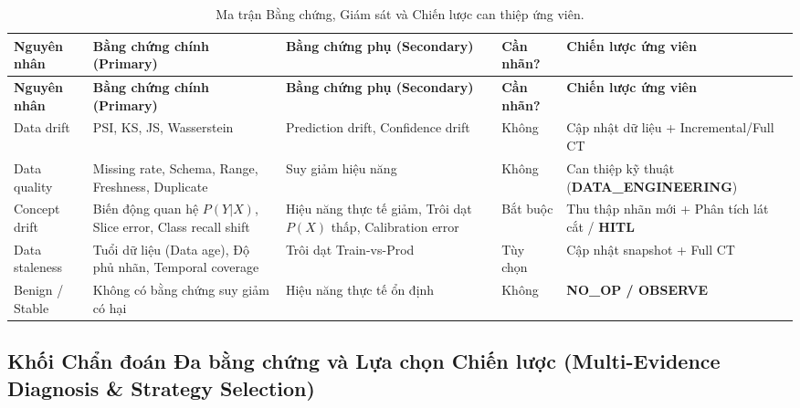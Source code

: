 \begin{xltabular}{\linewidth}{@{}L{2.6cm} L{3.6cm} L{3.4cm} C{1.4cm} Y@{}}
\caption{Ma trận Bằng chứng, Giám sát và Chiến lược can thiệp ứng viên.}\label{tab:evidence-matrix}\\
\toprule
\textbf{Nguyên nhân} & \textbf{Bằng chứng chính (Primary)} & \textbf{Bằng chứng phụ (Secondary)} & \textbf{Cần nhãn?} & \textbf{Chiến lược ứng viên} \\
\midrule
\endfirsthead
\toprule
\textbf{Nguyên nhân} & \textbf{Bằng chứng chính (Primary)} & \textbf{Bằng chứng phụ (Secondary)} & \textbf{Cần nhãn?} & \textbf{Chiến lược ứng viên} \\
\midrule
\endhead

Data drift & PSI, KS, JS, Wasserstein & Prediction drift, Confidence drift & Không & Cập nhật dữ liệu + Incremental/Full CT \\
\addlinespace

Data quality & Missing rate, Schema, Range, Freshness, Duplicate & Suy giảm hiệu năng & Không & Can thiệp kỹ thuật (\textbf{DATA\_ENGINEERING}) \\
\addlinespace

Concept drift & Biến động quan hệ $P(Y|X)$, Slice error, Class recall shift & Hiệu năng thực tế giảm, Trôi dạt $P(X)$ thấp, Calibration error & Bắt buộc & Thu thập nhãn mới + Phân tích lát cắt / \textbf{HITL} \\
\addlinespace

Data staleness & Tuổi dữ liệu (Data age), Độ phủ nhãn, Temporal coverage & Trôi dạt Train-vs-Prod & Tùy chọn & Cập nhật snapshot + Full CT \\
\addlinespace

Benign / Stable & Không có bằng chứng suy giảm có hại & Hiệu năng thực tế ổn định & Không & \textbf{NO\_OP / OBSERVE} \\
\bottomrule
\end{xltabular}

\subsection{Khối Chẩn đoán Đa bằng chứng và Lựa chọn Chiến lược (Multi-Evidence Diagnosis \& Strategy Selection)}

